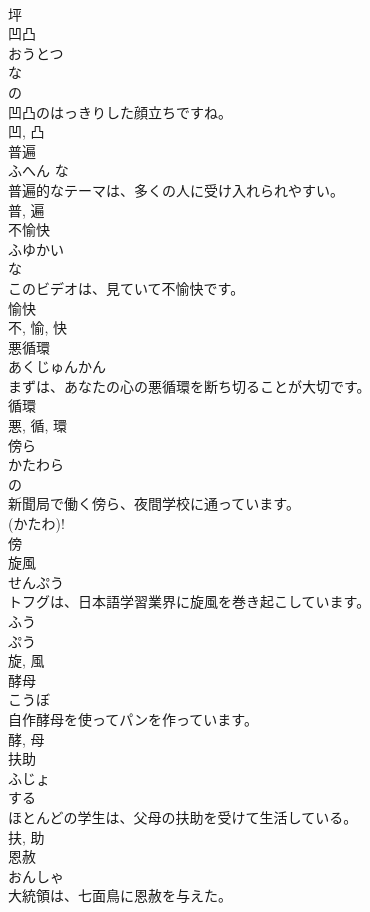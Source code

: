 \documentclass[8pt]{extreport}
\begin{document}
\begin{CJK}{UTF8}{min}
\\	坪	
\\	凹凸	
\\	おうとつ	
\\	な 
\\	の 
\\	凹凸のはっきりした顔立ちですね。	
\\	凹, 凸	
\\	普遍	
\\	ふへん	な 
\\	普遍的なテーマは、多くの人に受け入れられやすい。	
\\	普, 遍	
\\	不愉快	
\\	ふゆかい	
\\	な 
\\	このビデオは、見ていて不愉快です。	
\\	愉快 
\\	不, 愉, 快	
\\	悪循環	
\\	あくじゅんかん	
\\	まずは、あなたの心の悪循環を断ち切ることが大切です。	
\\	循環 
\\	悪, 循, 環	
\\	傍ら	
\\	かたわら	
\\	の 
\\	新聞局で働く傍ら、夜間学校に通っています。	
\\	(かたわ)! 
\\	傍	
\\	旋風	
\\	せんぷう	
\\	トフグは、日本語学習業界に旋風を巻き起こしています。	
\\	ふう 
\\	ぷう 
\\	旋, 風	
\\	酵母	
\\	こうぼ	
\\	自作酵母を使ってパンを作っています。	
\\	酵, 母	
\\	扶助	
\\	ふじょ	
\\	する 
\\	ほとんどの学生は、父母の扶助を受けて生活している。	
\\	扶, 助	
\\	恩赦	
\\	おんしゃ	
\\	大統領は、七面鳥に恩赦を与えた。	

\end{CJK}
\end{document}
